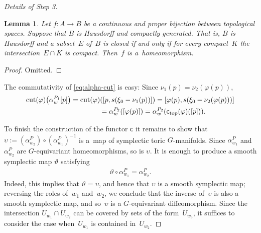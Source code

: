 \documentclass[pdftex]{sigma}
\numberwithin{equation}{section}
\newtheorem{Lemma}{Lemma}[section]
\begin{document}
\begin{proof}[Details of Step 3]
\begin{Lemma} \label{compactly generated}
Let $f \colon A \to B$ be a continuous and proper bijection
between topological spaces.  Suppose that $B$ is Hausdorff
and compactly generated.  That is, $B$ is Hausdorff and a subset~$E$ of~$B$ is closed if and only if for every compact~$K$
the intersection~$E \cap K$ is compact.
Then~$f$ is a~homeomorphism.
\end{Lemma}

\begin{proof}
Omitted.
\end{proof}

The commutativity of \eqref{eq:alpha-cut} is easy:
Since $\nu_1(p) = \nu_2(\varphi(p))$,
\begin{gather*}
  \operatorname{cut}(\varphi) \big(\alpha^{P_1}_w [p]\big) =  \operatorname{cut}(\varphi) ([p,s(\xi_0 - \nu_1(p))])
    =  [\varphi(p),s(\xi_0 - \nu_2(\varphi(p)))]\\
\hphantom{\operatorname{cut}(\varphi) \big(\alpha^{P_1}_w [p]\big)}{} = \alpha^{P_2}_w ([\varphi(p)])
  =    \alpha^{P_2}_w ({\textsf{c}_{\rm top}}(\varphi) ([p])).
\end{gather*}

To f\/inish the construction of the functor ${\textsf{c}}$ it remains to show
that $\upsilon:= (\alpha^P_{w_2 })\circ (\alpha^P_{w_1})^{-1}$ is a~map
of symplectic toric $G$-manifolds.
Since $\alpha^P_{w_1}$ and $\alpha^P_{w_2}$
are $G$-equivariant homeomorphisms, so is $\upsilon$.
It is enough to produce a smooth symplectic map $\vartheta$ satisfying
\begin{gather*}%
\vartheta \circ \alpha^P_{w_1} = \alpha^P_{w_2}.
\end{gather*}
Indeed, this implies that $\vartheta = \upsilon$,
and hence that $\upsilon$ is a smooth symplectic map;
reversing the roles of~$w_1$ and~$w_2$, we conclude that the inverse
of~$\upsilon$ is also a smooth symplectic map,
and so~$\upsilon$ is a $G$-equivariant dif\/feomorphism.
Since the intersection $U_{w_1} \cap U_{w_2}$ can be covered by sets
of the form~$U_{w_3}$, it suf\/f\/ices to consider the case when~$U_{w_1}$
is contained in~$U_{w_2}$.


\end{proof}
\end{document}
